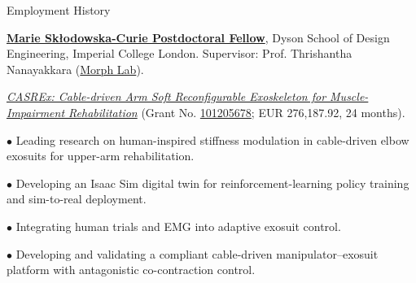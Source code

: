 

\begin{rubric}{Employment History}

    \entry*[2025 -- Present]%
        \textbf{\href{https://cordis.europa.eu/project/id/101205678}{Marie Skłodowska-Curie Postdoctoral Fellow}}, Dyson School of Design Engineering, Imperial College London. Supervisor: Prof. Thrishantha Nanayakkara (\href{https://www.imperial.ac.uk/morph-lab/}{Morph Lab}).
        \par \textit{\href{https://cordis.europa.eu/project/id/101205678}{CASREx: Cable-driven Arm Soft Reconfigurable Exoskeleton for Muscle-Impairment Rehabilitation}} (Grant No. \href{https://cordis.europa.eu/project/id/101205678}{101205678}; EUR 276,187.92, 24 months).
        \par $\bullet$ Leading research on human-inspired stiffness modulation in cable-driven elbow exosuits for upper-arm rehabilitation.
        \par $\bullet$ Developing an Isaac Sim digital twin for reinforcement-learning policy training and sim-to-real deployment.
        \par $\bullet$ Integrating human trials and EMG into adaptive exosuit control.
        \par $\bullet$ Developing and validating a compliant cable-driven manipulator--exosuit platform with antagonistic co-contraction control.
    

\end{rubric}

